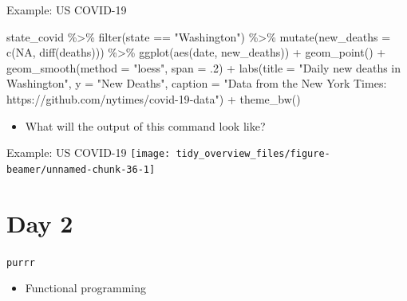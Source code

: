 \documentclass[
  ignorenonframetext,
]{beamer}
\newenvironment{Shaded}{\begin{snugshade}}{\end{snugshade}}
\newcommand{\AttributeTok}[1]{\textcolor[rgb]{0.77,0.63,0.00}{#1}}
\newcommand{\ConstantTok}[1]{\textcolor[rgb]{0.00,0.00,0.00}{#1}}
\newcommand{\DecValTok}[1]{\textcolor[rgb]{0.00,0.00,0.81}{#1}}
\newcommand{\FunctionTok}[1]{\textcolor[rgb]{0.00,0.00,0.00}{#1}}
\newcommand{\NormalTok}[1]{#1}
\newcommand{\SpecialCharTok}[1]{\textcolor[rgb]{0.00,0.00,0.00}{#1}}
\newcommand{\StringTok}[1]{\textcolor[rgb]{0.31,0.60,0.02}{#1}}
\providecommand{\tightlist}{%
  \setlength{\itemsep}{0pt}\setlength{\parskip}{0pt}}
\begin{document}
\begin{frame}[fragile]{Example: US COVID-19}
\protect\hypertarget{example-us-covid-19}{}
\begin{Shaded}
\begin{Highlighting}[]
\NormalTok{state\_covid }\SpecialCharTok{\%\textgreater{}\%} 
  \FunctionTok{filter}\NormalTok{(state }\SpecialCharTok{==} \StringTok{"Washington"}\NormalTok{) }\SpecialCharTok{\%\textgreater{}\%} 
  \FunctionTok{mutate}\NormalTok{(}\AttributeTok{new\_deaths =} \FunctionTok{c}\NormalTok{(}\ConstantTok{NA}\NormalTok{, }\FunctionTok{diff}\NormalTok{(deaths))) }\SpecialCharTok{\%\textgreater{}\%} 
  \FunctionTok{ggplot}\NormalTok{(}\FunctionTok{aes}\NormalTok{(date, new\_deaths)) }\SpecialCharTok{+}
  \FunctionTok{geom\_point}\NormalTok{() }\SpecialCharTok{+} 
  \FunctionTok{geom\_smooth}\NormalTok{(}\AttributeTok{method =} \StringTok{"loess"}\NormalTok{, }\AttributeTok{span =}\NormalTok{ .}\DecValTok{2}\NormalTok{) }\SpecialCharTok{+} 
  \FunctionTok{labs}\NormalTok{(}\AttributeTok{title =} \StringTok{"Daily new deaths in Washington"}\NormalTok{,}
       \AttributeTok{y =} \StringTok{"New Deaths"}\NormalTok{,}
       \AttributeTok{caption =} \StringTok{"Data from the New York Times: https://github.com/nytimes/covid{-}19{-}data"}\NormalTok{) }\SpecialCharTok{+} 
  \FunctionTok{theme\_bw}\NormalTok{()}
\end{Highlighting}
\end{Shaded}

\begin{itemize}
\tightlist
\item
  What will the output of this command look like?
\end{itemize}
\end{frame}

\begin{frame}{Example: US COVID-19}
\protect\hypertarget{example-us-covid-19-1}{}
\texttt{[image: tidy\_overview\_files/figure-beamer/unnamed-chunk-36-1]}
\end{frame}

\hypertarget{day-2}{%
\section{Day 2}\label{day-2}}

\begin{frame}{\texttt{purrr}}
\protect\hypertarget{purrr}{}
\begin{itemize}
\tightlist
\item
  Functional programming
\end{itemize}
\end{frame}
\end{document}
